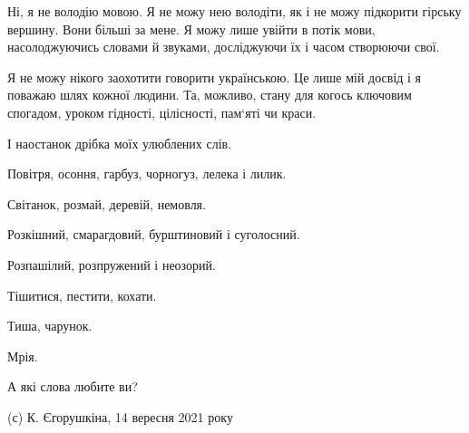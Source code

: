 Ні, я не володію мовою. Я не можу нею володіти, як і не можу підкорити гірську
вершину. Вони більші за мене. Я можу лише увійти в потік мови, насолоджуючись
словами й звуками, досліджуючи їх і часом створюючи свої.

Я не можу нікого заохотити говорити українською. Це лише мій досвід і я поважаю
шлях кожної людини. Та, можливо, стану для когось ключовим спогадом, уроком
гідності, цілісності, пам‘яті чи краси.

І наостанок дрібка моїх улюблених слів.

Повітря, осоння, гарбуз, чорногуз, лелека і лилик.

Світанок, розмай, деревій, немовля.

Розкішний, смарагдовий, бурштиновий і суголосний.

Розпашілий, розпружений і неозорий.

Тішитися, пестити, кохати.

Тиша, чарунок.

Мрія.

А які слова любите ви?

(с) К. Єгорушкіна, 14 вересня 2021 року
